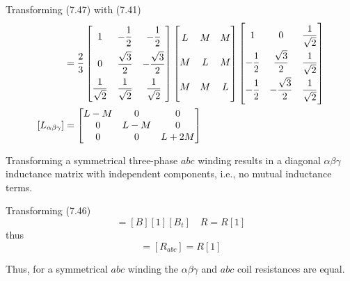 \documentclass[a4paper,numbers=noenddot,12pt]{scrbook}
\begin{document}
    Transforming (7.47) with (7.41)
    \begin{align}
        [L_{\alpha \beta \gamma}] & = \dfrac{2}{3}
        \begin{bmatrix}
            1 & - \dfrac{1}{2} & - \dfrac{1}{2} \\[2ex]
            0 & \dfrac{\sqrt{3}}{2} & - \dfrac{\sqrt{3}}{2} \\[2ex]
            \dfrac{1}{\sqrt{2}} & \dfrac{1}{\sqrt{2}} & \dfrac{1}{\sqrt{2}}
        \end{bmatrix}
        \begin{bmatrix}
            L \vphantom{\dfrac{1}{\sqrt{2}}} & M & M \\[2ex]
            M \vphantom{\dfrac{1}{\sqrt{2}}} & L & M \\[2ex]
            M \vphantom{\dfrac{1}{\sqrt{2}}} & M & L
        \end{bmatrix}
        \begin{bmatrix}
            1 & 0 & \dfrac{1}{\sqrt{2}} \\[2ex]
            - \dfrac{1}{2} & \dfrac{\sqrt{3}}{2} & \dfrac{1}{\sqrt{2}} \\[2ex]
            - \dfrac{1}{2} & - \dfrac{\sqrt{3}}{2} & \dfrac{1}{\sqrt{2}}
        \end{bmatrix} \nonumber \\
        [L_{\alpha \beta \gamma}] & =
        \begin{bmatrix}
            L - M & 0 & 0 \\
            0 & L - M & 0 \\
            0 & 0 & L + 2M 
        \end{bmatrix}
    \end{align}

    Transforming a symmetrical three-phase $abc$ winding results in a diagonal $\alpha \beta \gamma$ inductance matrix with independent components, i.e., no mutual inductance terms.

    Transforming (7.46)
    \begin{equation*}
        [R_{\alpha \beta \gamma}] = [B] [1] [B_t] \quad R = R[1]
    \end{equation*}
    thus
    \begin{equation}
        [R_{\alpha \beta \gamma}] = [R_{abc}] = R[1]
        \label{eq:Eq7.49}
    \end{equation}

    Thus, for a symmetrical $abc$ winding the $\alpha \beta \gamma$ and $abc$ coil resistances are equal.
\end{document}

